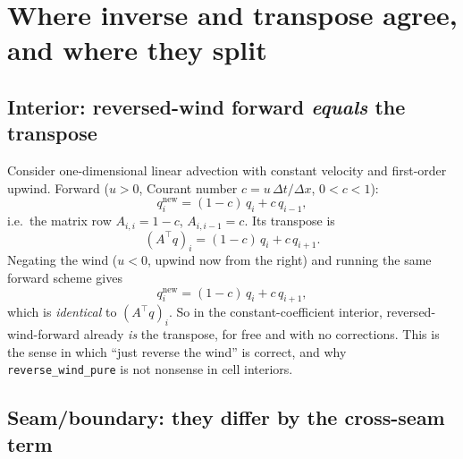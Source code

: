 \documentclass[11pt]{article}
\newcommand{\code}[1]{\texttt{#1}}
\begin{document}
\section{Where inverse and transpose agree, and where they split}

\subsection{Interior: reversed-wind forward \emph{equals} the transpose}

Consider one-dimensional linear advection with constant velocity and first-order
upwind. Forward ($u>0$, Courant number $c=u\,\Delta t/\Delta x$, $0<c<1$):
\begin{equation}
  q_i^{\text{new}} = (1-c)\,q_i + c\,q_{i-1},
\end{equation}
i.e.\ the matrix row $A_{i,i}=1-c$, $A_{i,i-1}=c$. Its transpose is
\begin{equation}
  (A^\top q)_i = (1-c)\,q_i + c\,q_{i+1}.
\end{equation}
Negating the wind ($u<0$, upwind now from the right) and running the same forward
scheme gives
\begin{equation}
  q_i^{\text{new}} = (1-c)\,q_i + c\,q_{i+1},
\end{equation}
which is \emph{identical} to $(A^\top q)_i$. So in the constant-coefficient
interior, reversed-wind-forward already \emph{is} the transpose, for free and
with no corrections. This is the sense in which ``just reverse the wind'' is
correct, and why \code{reverse\_wind\_pure} is not nonsense in cell interiors.

\subsection{Seam/boundary: they differ by the cross-seam term}
\end{document}

